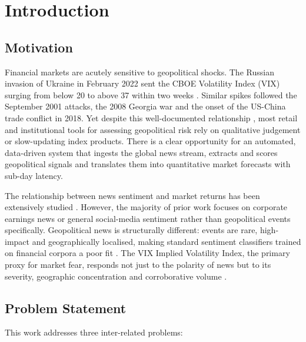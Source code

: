 \documentclass[12pt,a4paper]{report}
\begin{document}
\chapter{Introduction}
\label{ch:intro}

\section{Motivation}

Financial markets are acutely sensitive to geopolitical shocks. The Russian
invasion of Ukraine in February 2022 sent the CBOE Volatility Index (VIX)
surging from below 20 to above 37 within two weeks \cite{caldara2022}.
Similar spikes followed the September 2001 attacks, the 2008 Georgia war
and the onset of the US-China trade conflict in 2018. Yet despite this
well-documented relationship \cite{bloom2009}, most retail and institutional
tools for assessing geopolitical risk rely on qualitative judgement or
slow-updating index products. There is a clear opportunity for an automated,
data-driven system that ingests the global news stream, extracts and scores
geopolitical signals and translates them into quantitative market forecasts
with sub-day latency.

The relationship between news sentiment and market returns has been
extensively studied \cite{tetlock2007, loughran2011, bollen2011}. However,
the majority of prior work focuses on corporate earnings news or general
social-media sentiment rather than geopolitical events specifically.
Geopolitical news is structurally different: events are rare, high-impact
and geographically localised, making standard sentiment classifiers trained
on financial corpora a poor fit \cite{nassirtoussi2014}. The VIX Implied
Volatility Index, the primary proxy for market fear, responds not just to
the polarity of news but to its severity, geographic concentration and
corroborative volume \cite{manela2017}.

\section{Problem Statement}

This work addresses three inter-related problems:
\end{document}
